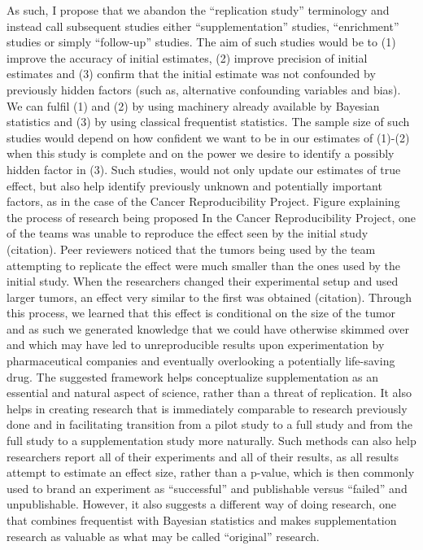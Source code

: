 \documentclass[12pt]{article}
\begin{document}
As such, I propose that we abandon the “replication study” terminology and instead call subsequent studies either “supplementation” studies, “enrichment” studies or simply “follow-up” studies. The aim of such studies would be to (1) improve the accuracy of initial estimates, (2) improve precision of initial estimates and (3) confirm that the initial estimate was not confounded by previously hidden factors (such as, alternative confounding variables and bias). We can fulfil (1) and (2) by using machinery already available by Bayesian statistics and (3) by using classical frequentist statistics. The sample size of such studies would depend on how confident we want to be in our estimates of (1)-(2) when this study is complete and on the power we desire to identify a possibly hidden factor in (3). Such studies, would not only update our estimates of true effect, but also help identify previously unknown and potentially important factors, as in the case of the Cancer Reproducibility Project.
Figure explaining the process of research being proposed
In the Cancer Reproducibility Project, one of the teams was unable to reproduce the effect seen by the initial study (citation). Peer reviewers noticed that the tumors being used by the team attempting to replicate the effect were much smaller than the ones used by the initial study. When the researchers changed their experimental setup and used larger tumors, an effect very similar to the first was obtained (citation). Through this process, we learned that this effect is conditional on the size of the tumor and as such we generated knowledge that we could have otherwise skimmed over and which may have led to unreproducible results upon experimentation by pharmaceutical companies and eventually overlooking a potentially life-saving drug. 
The suggested framework helps conceptualize supplementation as an essential and natural aspect of science, rather than a threat of replication. It also helps in creating research that is immediately comparable to research previously done and in facilitating transition from a pilot study to a full study and from the full study to a supplementation study more naturally. Such methods can also help researchers report all of their experiments and all of their results, as all results attempt to estimate an effect size, rather than a p-value, which is then commonly used to brand an experiment as “successful” and publishable versus “failed” and unpublishable. However, it also suggests a different way of doing research, one that combines frequentist with Bayesian statistics and makes supplementation research as valuable as what may be called “original” research.
\end{document}
